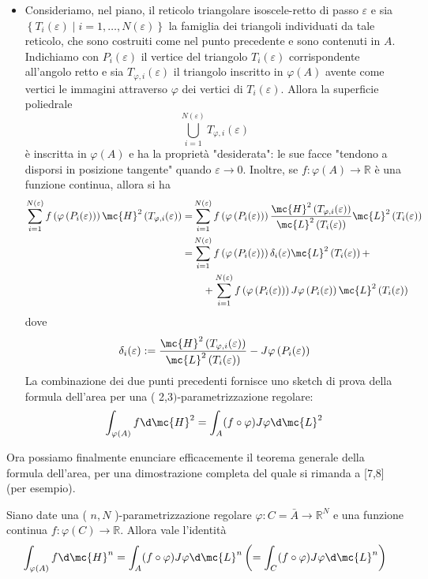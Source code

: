 \begin{itemize}
    \item Consideriamo, nel piano, il reticolo triangolare isoscele-retto di passo $\varepsilon$ e sia $\left\{T_{i}(\varepsilon) \mid i=1, \ldots, N(\varepsilon)\right\}$ la famiglia dei triangoli individuati da tale reticolo, che sono costruiti come nel punto precedente e sono contenuti in $A$. Indichiamo con $P_{i}(\varepsilon)$ il vertice del triangolo $T_{i}(\varepsilon)$ corrispondente all'angolo retto e sia $T_{\varphi, i}(\varepsilon)$ il triangolo inscritto in $\varphi(A)$ avente come vertici le immagini attraverso $\varphi$ dei vertici di $T_{i}(\varepsilon)$. Allora la superficie poliedrale
    \[\bigcup_{i=1}^{N(\varepsilon)} T_{\varphi, i}(\varepsilon)\]
    è inscritta in $\varphi(A)$ e ha la proprietà "desiderata": le sue facce "tendono a disporsi in posizione tangente" quando $\varepsilon \rightarrow 0$. Inoltre, se $f: \varphi(A) \rightarrow \mathbb{R}$ è una funzione continua, allora si ha 
        \[\begin{aligned}
        \sum_{i=1}^{N(\varepsilon)} f\left(\varphi\left(P_{i}(\varepsilon)\right)\right) \mc{H}^{2}\left(T_{\varphi, i}(\varepsilon)\right)= & \sum_{i=1}^{N(\varepsilon)} f\left(\varphi\left(P_{i}(\varepsilon)\right)\right) \frac{\mc{H}^{2}\left(T_{\varphi, i}(\varepsilon)\right)}{\mc{L}^{2}\left(T_{i}(\varepsilon)\right)} \mc{L}^{2}\left(T_{i}(\varepsilon)\right) \\
        = & \sum_{i=1}^{N(\varepsilon)} f\left(\varphi\left(P_{i}(\varepsilon)\right)\right) \delta_{i}(\varepsilon) \mc{L}^{2}\left(T_{i}(\varepsilon)\right)+ \\
        & \quad+\sum_{i=1}^{N(\varepsilon)} f\left(\varphi\left(P_{i}(\varepsilon)\right)\right) J \varphi\left(P_{i}(\varepsilon)\right) \mc{L}^{2}\left(T_{i}(\varepsilon)\right)
        \end{aligned}\]    
    dove
        \[\delta_{i}(\varepsilon):=\frac{\mc{H}^{2}\left(T_{\varphi, i}(\varepsilon)\right)}{\mc{L}^{2}\left(T_{i}(\varepsilon)\right)}-J \varphi\left(P_{i}(\varepsilon)\right)\]
        La combinazione dei due punti precedenti fornisce uno sketch di prova della formula dell'area per una ( 2,3$)$-parametrizzazione regolare:  
        \[\int_{\varphi(A)} f \d \mc{H}^{2}=\int_{A}(f \circ \varphi) J \varphi \d \mc{L}^{2}\]       
\end{itemize}

Ora possiamo finalmente enunciare efficacemente il teorema generale della formula dell'area, per una dimostrazione completa del quale si rimanda a [7,8] (per esempio).
\begin{shadedTheorem} \label{thm: 2.11 formula-dell-area}
    Siano date una ( $n, N$ )-parametrizzazione regolare $\varphi: C=\bar{A} \rightarrow \mathbb{R}^{N}$ e una funzione continua $f: \varphi(C) \rightarrow \mathbb{R}$. Allora vale l'identità
    \[\int_{\varphi(A)} f \d \mc{H}^{n}=\int_{A}(f \circ \varphi) J \varphi \d \mc{L}^{n}\left(=\int_{C}(f \circ \varphi) J \varphi \d \mc{L}^{n}\right)\]
\end{shadedTheorem}


